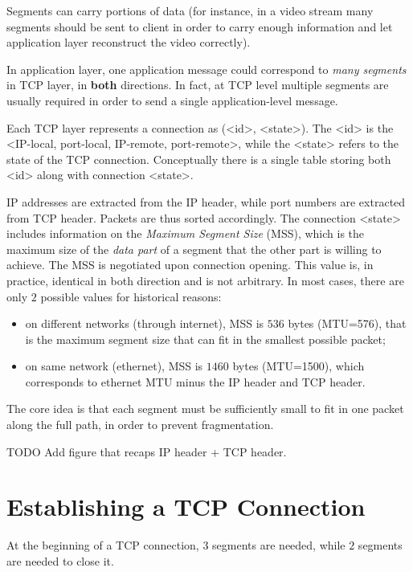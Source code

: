 \documentclass[a4paper, 11pt]{report}
\begin{document}
Segments can carry portions of data (for instance, in a video stream many
segments should be sent to client in order to carry enough information and let
application layer reconstruct the video correctly).

In application layer, one application message could correspond to \emph{many
segments} in TCP layer, in \textbf{both} directions. In fact, at TCP level
multiple segments are usually required in order to send a single
application-level message.

Each TCP layer represents a connection as (<id>, <state>). The <id> is the
<IP-local, port-local, IP-remote, port-remote>, while the <state> refers to the
state of the TCP connection. Conceptually there is a single table storing both
<id> along with connection <state>.

IP addresses are extracted from the IP header, while port numbers are extracted
from TCP header. Packets are thus sorted accordingly. The connection <state>
includes information on the \emph{Maximum Segment Size} (MSS), which is the
maximum size of the \emph{data part} of a segment that the other part is
willing to achieve. The MSS is negotiated upon connection opening. This value
is, in practice, identical in both direction and is not arbitrary. In most
cases, there are only $2$ possible values for historical reasons:

\begin{itemize}
	\item on different networks (through internet), MSS is $536$ bytes (MTU=576),
		that is the maximum segment size that can fit in the smallest
		possible packet;
	\item on same network (ethernet), MSS is $1460$ bytes (MTU=1500), which
		corresponds to ethernet MTU minus the IP header and TCP header.
\end{itemize}

The core idea is that each segment must be sufficiently small to fit in one
packet along the full path, in order to prevent fragmentation.

TODO Add figure that recaps IP header + TCP header.

\section{Establishing a TCP Connection}

At the beginning of a TCP connection, $3$ segments are needed, while $2$ segments are needed to close it.
\end{document}
